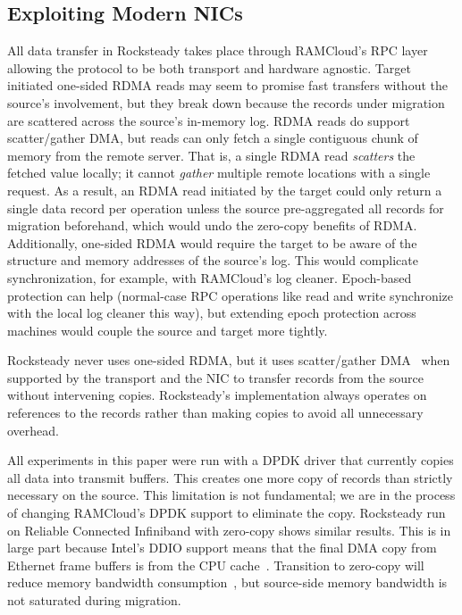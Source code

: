 \subsection{Exploiting Modern NICs}
\label{sec:hw}
All data transfer in Rocksteady takes place through RAMCloud's RPC layer
allowing the protocol to be both transport and hardware agnostic. Target
initiated one-sided RDMA reads may seem to promise fast transfers without the
source's involvement, but they break down because the records under migration are
scattered across the source's in-memory log. RDMA reads do support
scatter/gather DMA, but reads can only fetch a single contiguous chunk of
memory from the remote server. That is, a single RDMA read {\em scatters} the
fetched value locally; it cannot {\em gather} multiple remote locations with a
single request. As a result, an RDMA read initiated by the target could only
return a single data record per operation unless the source
pre-aggregated all records for migration beforehand, which would undo the
zero-copy benefits of RDMA.
Additionally, one-sided RDMA would require the target
to be aware of the structure and memory addresses of the source's log. This
would complicate synchronization, for example, with RAMCloud's log cleaner.
Epoch-based protection can help (normal-case RPC operations like read and write
synchronize with the local log cleaner this way), but extending epoch
protection across machines would couple the source and target more
tightly.

Rocksteady never uses one-sided RDMA, but it uses scatter/gather
DMA~\cite{ramcloud} when supported by the transport and the NIC to transfer
records from the source without intervening copies.
Rocksteady's implementation always operates on references to 
the records rather than making copies to avoid all
unnecessary overhead.

All experiments in this paper were run with a DPDK driver that currently
copies all data into transmit buffers. This creates one more copy of records
than strictly necessary on the source. This limitation is not fundamental;
we are in the process of changing RAMCloud's DPDK support to eliminate the
copy.  Rocksteady run on Reliable Connected Infiniband with zero-copy shows
similar results. This is in large part because Intel's DDIO support means that
the final DMA copy from Ethernet frame buffers is from the CPU
cache~\cite{ddio}.
Transition to zero-copy will reduce memory bandwidth
consumption~\cite{kesavan:copy}, but source-side memory bandwidth is not
saturated during migration.


